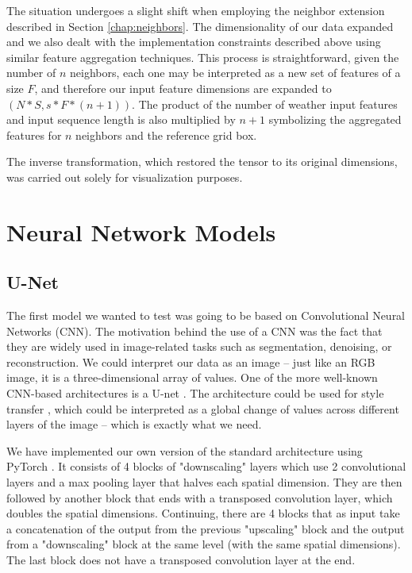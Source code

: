 The situation undergoes a slight shift when employing the neighbor extension described in Section \ref{chap:neighbors}. The dimensionality of our data expanded and we also dealt with the implementation constraints described above using similar feature aggregation techniques. This process is straightforward, given the number of $n$ neighbors, each one may be interpreted as a new set of features of a size $F$, and therefore our input feature dimensions are expanded to $(N*S, s*F*(n+1))$. The product of the number of weather input features and input sequence length is also multiplied by $n+1$ symbolizing the aggregated features for $n$ neighbors and the reference grid box. 

The inverse transformation, which restored the tensor to its original dimensions, was carried out solely for visualization purposes.

\section{Neural Network Models} \label{NN-theory}
\subsection{U-Net}\label{chap:unet}

The first model we wanted to test was going to be based on Convolutional Neural Networks (CNN). The motivation behind the use of a CNN was the fact that they are widely used in image-related tasks such as segmentation, denoising, or reconstruction. We could interpret our data as an image -- just like an RGB image, it is a three-dimensional array of values. One of the more well-known CNN-based architectures is a U-net \cite{ronneberger2015unet}. The architecture could be used for style transfer \cite{Rao_2021}, which could be interpreted as a global change of values across different layers of the image -- which is exactly what we need.

We have implemented our own version of the standard architecture using PyTorch \cite{paszke2019pytorch}. It consists of 4 blocks of "downscaling" layers which use 2 convolutional layers and a max pooling layer that halves each spatial dimension. They are then followed by another block that ends with a transposed convolution layer, which doubles the spatial dimensions. Continuing, there are 4 blocks that as input take a concatenation of the output from the previous "upscaling" block and the output from a "downscaling" block at the same level (with the same spatial dimensions). The last block does not have a transposed convolution layer at the end.

